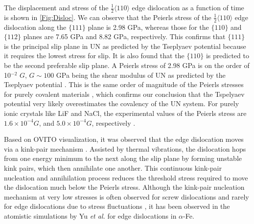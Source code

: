 \documentclass[applsci,article,submit,pdftex,moreauthors]{Definitions/mdpi}
\newcommand{\?}{\stackrel{?}{=}}
\begin{document}
The displacement and stress of the $\frac{1}{2} \langle 110 \rangle$ edge dislocation as a function of time is shown in \cref{Fig:Disloc}. We can observe that the Peierls stress of the $\frac{1}{2} \langle 110 \rangle$ edge dislocation along the $\{ 111 \}$ plane is 2.98 GPa, whereas those for the $\{ 110 \}$ and $\{ 112 \}$ planes are 7.65 GPa and 8.82 GPa, respectively. This confirms that $\{ 111 \}$ is the principal slip plane in UN as predicted by the Tseplyaev potential because it requires the lowest stress for slip. It is also found that the $\{ 110 \}$ is predicted to be the second preferable slip plane. A Peierls stress of 2.98 GPa is on the order of 10$^{-2}$ $G$, $G \sim 100$ GPa being the shear modulus of UN as predicted by the Tseplyaev potential \cite{AbdulHameed2024}. This is the same order of magnitude of the Peierls stresses for purely covalent materials \cite{Hull2011}, which confirms our conclusion that the Tspelyaev potential very likely overestimates the covalency of the UN system. For purely ionic crystals like LiF and NaCl, the experimental values of the Peierls stress are $1.6 \times 10^{-4} G$, and $5.0 \times 10^{-4} G$, respectively \cite{Liu2012}.

Based on OVITO visualization, it was observed that the edge dislocation moves via a kink-pair mechanism \cite{Hull2011}. Assisted by thermal vibrations, the dislocation hops from one energy minimum to the next along the slip plane by forming unstable kink pairs, which then annihilate one another. This continuous kink-pair nucleation and annihilation process reduces the threshold stress required to move the dislocation much below the Peierls stress. Although the kink-pair nucleation mechanism at very low stresses is often observed for screw dislocations and rarely for edge dislocations due to stress fluctuations \cite{Gilbert2011, Starikov2020}, it has been observed in the atomistic simulations by Yu \textit{et al.} \cite{Yu2009b} for edge dislocations in $\alpha$-Fe.
\end{document}
